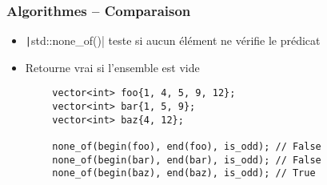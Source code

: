\documentclass[C++.tex]{subfiles}
\begin{document}
\begin{frame}[fragile]
	\frametitle{Algorithmes -- Comparaison}
	\begin{itemize}
		\item \texttt|std::none_of()| teste si aucun élément ne vérifie le prédicat
		\item Retourne vrai si l'ensemble est vide
	\end{itemize}

	\begin{verbatim}
		vector<int> foo{1, 4, 5, 9, 12};
		vector<int> bar{1, 5, 9};
		vector<int> baz{4, 12};

		none_of(begin(foo), end(foo), is_odd); // False
		none_of(begin(bar), end(bar), is_odd); // False
		none_of(begin(baz), end(baz), is_odd); // True
	\end{verbatim}

\end{frame}
\end{document}
